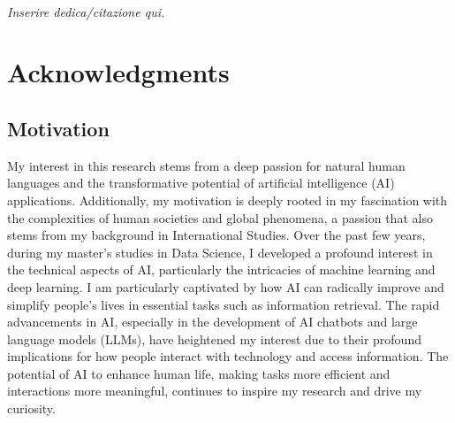 
\LogoWidth{7cm} %

\begin{titlepage}
    \pagestyle{empty}
    \makefrontpage
    \restoregeometry
\end{titlepage}

\frontmatter
~ \newpage
\null{}
\begin{flushright}
    \textit{Inserire dedica/citazione qui.}
\end{flushright}
\null

\chapter*{Acknowledgments}

\section*{Motivation}
My interest in this research stems from a deep passion for natural human languages and the transformative potential of artificial intelligence (AI) applications. Additionally, my motivation is deeply rooted in my fascination with the complexities of human societies and global phenomena, a passion that also stems from my background in International Studies. Over the past few years, during my master's studies in Data Science, I developed a profound interest in the technical aspects of AI, particularly the intricacies of machine learning and deep learning. I am particularly captivated by how AI can radically improve and simplify people's lives in essential tasks such as information retrieval. The rapid advancements in AI, especially in the development of AI chatbots and large language models (LLMs), have heightened my interest due to their profound implications for how people interact with technology and access information. The potential of AI to enhance human life, making tasks more efficient and interactions more meaningful, continues to inspire my research and drive my curiosity.

